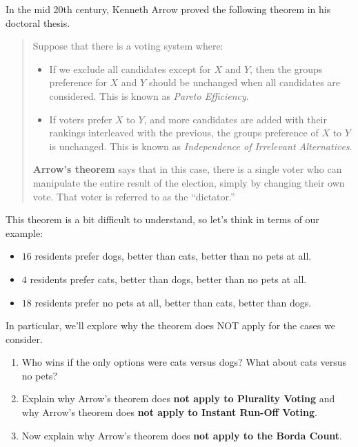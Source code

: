\documentclass[nooutcomes,noauthor,hints,handout,12pt]{ximera}
\begin{document}
\begin{question}
  In the mid 20th century, Kenneth Arrow proved the following theorem in his doctoral thesis.
 \begin{mdframed}[style=OutcomeStyle]
  \begin{quote}
    Suppose that there is a voting system where:
    \begin{itemize}
    \item If we exclude all candidates except for $X$ and $Y$, then
      the groups preference for $X$ and $Y$ should be unchanged when
      all candidates are considered. This is known as \textit{Pareto
        Efficiency}.
    \item If voters prefer $X$ to $Y$, and more candidates are added
      with their rankings interleaved with the previous, the groups
      preference of $X$ to $Y$ is unchanged. This is known as
      \textit{Independence of Irrelevant Alternatives}.
    \end{itemize}
    \textbf{Arrow's theorem} says that in this case,
    there is a single voter who can manipulate the entire result of
    the election, simply by changing their own vote.  That voter is
    referred to as the ``dictator.''
  \end{quote}
 \end{mdframed}
This theorem is a bit difficult to understand, so let's think in terms
of our example:
\begin{itemize}
\item $16$ residents prefer dogs, better than cats, better than no pets at all.
\item $4$ residents prefer cats, better than dogs, better than no pets at all.
\item $18$ residents prefer no pets at all, better than cats, better
  than dogs.
\end{itemize}
In particular, we'll explore why the theorem does NOT apply for the cases we consider. 
\begin{enumerate}
\item Who wins if the only options were cats versus dogs? What about
  cats versus no pets?
\item Explain why Arrow's theorem does \textbf{not apply to Plurality Voting} and
  why Arrow's theorem does \textbf{not apply to Instant Run-Off Voting}.
\item Now explain why Arrow's theorem does \textbf{not apply to the Borda Count}.
\end{enumerate}

\end{question}
\mynewpage
\end{document}
